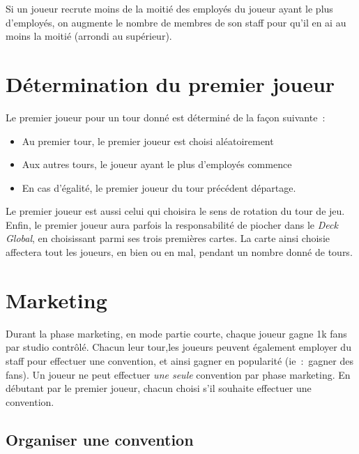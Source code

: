                 Si un joueur recrute moins de la moitié des employés du joueur ayant le plus d'employés, on augmente
                le nombre de membres de son staff pour qu'il en ai au moins la moitié (arrondi au supérieur).

        \section{Détermination du premier joueur}

            Le premier joueur pour un tour donné est déterminé de la façon suivante :
            \begin{itemize}
                \item Au premier tour, le premier joueur est choisi aléatoirement
                \item Aux autres tours, le joueur ayant le plus d'employés commence
                \item En cas d'égalité, le premier joueur du tour précédent départage.
            \end{itemize}

            Le premier joueur est aussi celui qui choisira le sens de rotation du tour de jeu.
            \newline
            Enfin, le premier joueur aura parfois la responsabilité de piocher dans le
            \emph{Deck Global}, en choisissant parmi ses trois premières cartes. La
            carte ainsi choisie affectera tout les joueurs, en bien ou en mal, pendant
            un nombre donné de tours.

        \section{Marketing}

            Durant la phase marketing, en mode partie courte, chaque joueur gagne 1k fans par
            studio contrôlé.
            \newline
            Chacun leur tour,les joueurs peuvent également employer du staff pour effectuer
            une convention, et ainsi gagner en popularité (ie : gagner des fans).
            Un joueur ne peut effectuer \emph{une seule} convention par phase marketing.
            \newline
            En débutant par le premier joueur, chacun choisi s'il souhaite effectuer une convention.
            \subsection{Organiser une convention}

